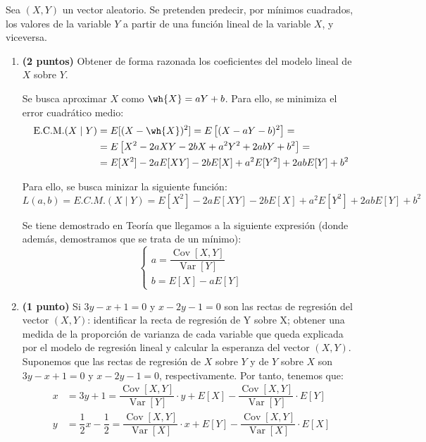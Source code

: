 \documentclass[12pt]{article}
\DeclareMathOperator{\Var}{Var}
\DeclareMathOperator{\Cov}{Cov}
\begin{document}
    \begin{ejercicio}[3 puntos]
        Sea $(X,Y)$ un vector aleatorio. Se pretenden predecir, por mínimos cuadrados, los valores de la variable $Y$ a partir de una función lineal de la variable $X$, y viceversa.
        \begin{enumerate}
            \item \textbf{(2 puntos)} Obtener de forma razonada los coeficientes del modelo lineal de $X$ sobre $Y$.
            
            Se busca aproximar $X$ como $\wh{X}=aY+b$. Para ello, se minimiza el error cuadrático medio:
            \begin{align*}
                \text{E.C.M.}(X\mid Y) &= E[(X-\wh{X})^2]
                = E\left[(X-aY-b)^2\right]
                =\\&= E\left[X^2-2aXY-2bX+a^2Y^2+2abY+b^2\right]
                =\\&= E[X^2]-2aE[XY]-2bE[X]+a^2E[Y^2]+2abE[Y]+b^2
            \end{align*}

            Para ello, se busca minizar la siguiente función:
            \begin{equation*}
                L(a,b) = E.C.M.(X\mid Y) = E[X^2]-2aE[XY]-2bE[X]+a^2E[Y^2]+2abE[Y]+b^2
            \end{equation*}

            Se tiene demostrado en Teoría que llegamos a la siguiente expresión (donde además, demostramos que se trata de un mínimo):
            \begin{equation*}
                \begin{cases}
                    a = \dfrac{\Cov[X,Y]}{\Var[Y]} \\
                    b = E[X]-aE[Y]
                \end{cases}
            \end{equation*}
            \item \textbf{(1 punto)} Si $3y-x+1=0$ y $x-2y-1=0$ son las rectas de regresión del vector $(X,Y)$: identificar la recta de regresión de Y sobre X; obtener una medida de la proporción de varianza de cada variable que queda explicada por el modelo de regresión lineal y calcular la esperanza del vector $(X,Y)$.\\
            
            Suponemos que las rectas de regresión de $X$ sobre $Y$ y de $Y$ sobre $X$ son $3y-x+1=0$ y $x-2y-1=0$, respectivamente. Por tanto, tenemos que:
            \begin{align*}
                x &= 3y+1 = \dfrac{\Cov[X,Y]}{\Var[Y]}\cdot y + E[X]-\dfrac{\Cov[X,Y]}{\Var[Y]}\cdot E[Y] \\
                y &= \dfrac{1}{2}x-\dfrac{1}{2} = \dfrac{\Cov[X,Y]}{\Var[X]}\cdot x + E[Y]-\dfrac{\Cov[X,Y]}{\Var[X]}\cdot E[X]
            \end{align*}


\end{enumerate}
\end{ejercicio}
\end{document}
